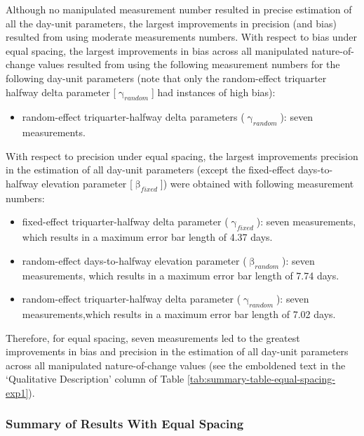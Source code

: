 \documentclass[
12pt, %
twoside,
english]{guelphthesis}
\begin{document}
Although no manipulated measurement number resulted in precise estimation of all the day-unit parameters, the largest improvements in precision (and bias) resulted from using moderate measurements numbers. With respect to bias under equal spacing, the largest improvements in bias across all manipulated nature-of-change values resulted from using the following measurement numbers for the following day-unit parameters (note that only the random-effect triquarter halfway delta parameter {[}\(\upgamma_{random}\){]} had instances of high bias):
\begin{itemize}
\tightlist
\item
  random-effect triquarter-halfway delta parameters (\(\upgamma_{random}\)): seven measurements.
\end{itemize}
\noindent With respect to precision under equal spacing, the largest improvements precision in the estimation of all day-unit parameters (except the fixed-effect days-to-halfway elevation parameter {[}\(\upbeta_{fixed}\){]}) were obtained with following measurement numbers:
\begin{itemize}
\tightlist
\item
  fixed-effect triquarter-halfway delta parameter (\(\upgamma_{fixed}\)): seven measurements, which results in a maximum error bar length of 4.37 days.
\item
  random-effect days-to-halfway elevation parameter (\(\upbeta_{random}\)): seven measurements, which results in a maximum error bar length of 7.74 days.
\item
  random-effect triquarter-halfway delta parameter (\(\upgamma_{random}\)): seven measurements,which results in a maximum error bar length of 7.02 days.
\end{itemize}
\noindent Therefore, for equal spacing, seven measurements led to the greatest improvements in bias and precision in the estimation of all day-unit parameters across all manipulated nature-of-change values (see the emboldened text in the `Qualitative Description' column of Table \ref{tab:summary-table-equal-spacing-exp1}).

\hypertarget{summary-of-results-with-equal-spacing}{%
\subsubsection{Summary of Results With Equal Spacing}\label{summary-of-results-with-equal-spacing}}
\end{document}
